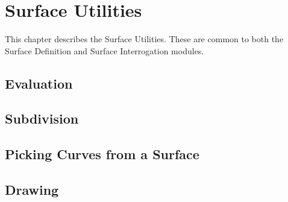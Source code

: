 \chapter{Surface Utilities}
\label{surfaceutilities}
This chapter describes the Surface Utilities. These are common to both
the Surface Definition and Surface Interrogation modules.


\pgsbreak
\section{Evaluation}

\pgsbreak

\pgsbreak

\pgsbreak

\pgsbreak

\pgsbreak
\section{Subdivision}

\pgsbreak

\pgsbreak
\section{Picking Curves from a Surface}

\pgsbreak

\pgsbreak

\pgsbreak

\pgsbreak
\section{Drawing}

\pgsbreak

\pgsbreak

\pgsbreak

\pgsbreak

